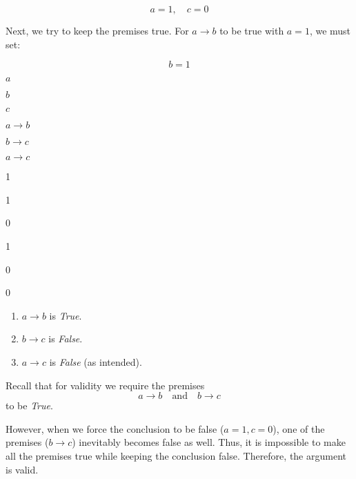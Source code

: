 \[
a = 1, \quad c = 0
\]

Next, we try to keep the premises true. For \(a \rightarrow b\) to be
true with \(a = 1\), we must set:

\[
b = 1
\]

\(a\)

\(b\)

\(c\)

\(a \rightarrow b\)

\(b \rightarrow c\)

\(a \rightarrow c\)

1

1

0

1

0

0

\begin{enumerate}
\def\labelenumi{\arabic{enumi}.}
\tightlist
\item
  \(a \rightarrow b\) is \emph{True}.\\
\item
  \(b \rightarrow c\) is \emph{False}.\\
\item
  \(a \rightarrow c\) is \emph{False} (as intended).
\end{enumerate}

Recall that for validity we require the premises
\[a \rightarrow b \quad \text{and} \quad b \rightarrow c\] to be
\emph{True}.

However, when we force the conclusion to be false (\(a=1, c=0\)), one of
the premises (\(b \rightarrow c\)) inevitably becomes false as well.
Thus, it is impossible to make all the premises true while keeping the
conclusion false. Therefore, the argument is valid.
